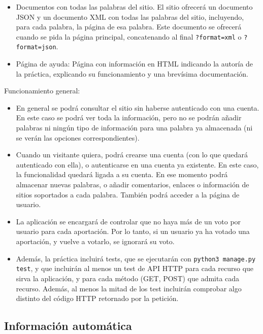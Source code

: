 \begin{itemize}
\item Documentos con todas las palabras del sitio. El sitio ofrecerá un documento JSON y un documento XML con todas las palabras del sitio, incluyendo, para cada palabra, la página de esa palabra. Este documento se ofrecerá cuando se pida la página principal, concatenando al final \verb|?format=xml| o \verb|?format=json|.
 
\item Página de ayuda: Página con información en HTML indicando la autoría de la práctica, explicando su funcionamiento y una brevísima documentación.
\end{itemize}

Funcionamiento general:

\begin{itemize}
\item En general se podrá consultar el sitio sin haberse autenticado con una cuenta. En este caso se podrá ver toda la información, pero no se podrán añadir palabras ni ningún tipo de información para una palabra ya almacenada (ni se verán las opciones correspondientes).

\item Cuando un visitante quiera, podrá crearse una cuenta (con lo que quedará autenticado con ella), o autenticarse en una cuenta ya existente. En este caso, la funcionalidad quedará ligada a su cuenta. En ese momento podrá almacenar nuevas palabras, o añadir comentarios, enlaces o información de sitios soportados a cada palabra. También podrá acceder a la página de usuario.

\item La aplicación se encargará de controlar que no haya más de un voto por usuario para cada aportación. Por lo tanto, si un usuario ya ha votado una aportación, y vuelve a votarlo, se ignorará su voto.

\item Además, la práctica incluirá tests, que se ejecutarán con \verb|python3 manage.py test|, y que incluirán al menos un test de API HTTP para cada recurso que sirva la aplicación, y para cada método (GET, POST) que admita cada recurso. Además, al menos la mitad de los test incluirán comprobar algo distinto del código HTTP retornado por la petición.

\end{itemize}


\subsection{Información automática}
\label{sec:practica-final-2022-05:automatica}

